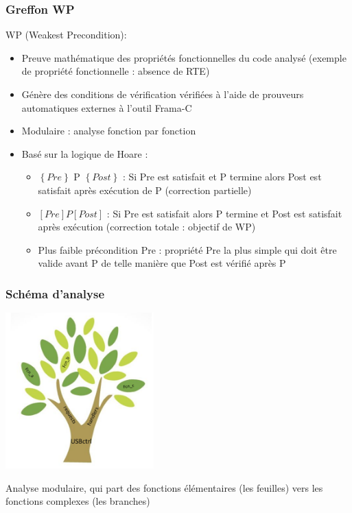 \documentclass[french]{beamer}
\begin{document}
\begin{frame}
\frametitle{Greffon WP}

WP (Weakest Precondition):
\begin{itemize}
	\item Preuve mathématique des propriétés fonctionnelles du code analysé (exemple de propriété fonctionnelle : absence de RTE)
	\item Génère des conditions de vérification vérifiées à l'aide de prouveurs automatiques externes à l'outil Frama-C
	\item Modulaire : analyse fonction par fonction
	\item Basé sur la logique de Hoare :
		\begin{itemize}
			\item $\left\{Pre\right\}$ P $\left\{Post\right\}$ : Si Pre est satisfait et P termine alors Post est satisfait après exécution de P (correction partielle)
			\item $[Pre] P [Post]$ : Si Pre est satisfait alors P termine et Post est satisfait après exécution (correction totale : objectif de WP)
			\item Plus faible précondition Pre :  propriété Pre la plus simple qui doit être valide avant P de telle manière que Post est vérifié après P
		\end{itemize}
\end{itemize}


\end{frame}


\begin{frame}
\frametitle{Schéma d'analyse}

\begin{center}
 \includegraphics[height=6cm]{images/schema_analyse_WP.png}
\end{center}

Analyse modulaire, qui part des fonctions élémentaires (les feuilles) vers les fonctions complexes (les branches)

\end{frame}
\end{document}
